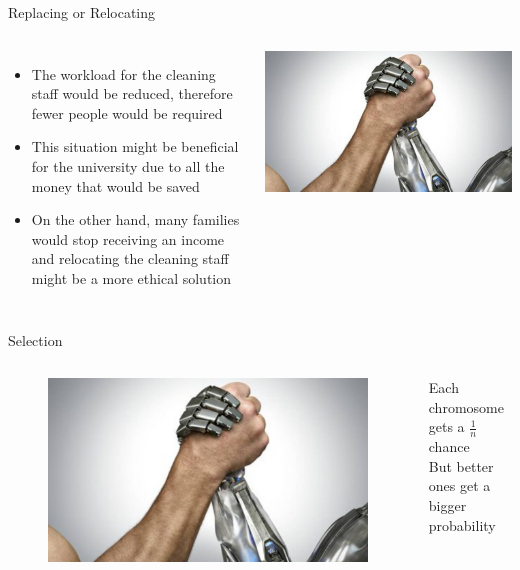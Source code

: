 \documentclass[18pt]{beamer}
\begin{document}
    \begin{frame}{Replacing or Relocating}
        \begin{columns}
            \begin{itemize}
                \item The workload for the cleaning staff would be reduced, therefore fewer people would be required
                \item This situation might be beneficial for the university due to all the money that would be saved
                \item On the other hand, many families would stop receiving an income and relocating the cleaning staff might be a more ethical solution
            \end{itemize}
            \includegraphics[width=0.99\columnwidth]{humanvsrobot}
        \end{columns}
    \end{frame}

    \begin{frame}{Selection}
        \begin{columns}
                \begin{figure}
                \includegraphics[scale=0.25]{humanvsrobot}
                \end{figure}
                Each chromosome gets a $ \frac{1}{n} $ chance\\
                But better ones get a bigger probability
        \end{columns}
    \end{frame}
\end{document}
